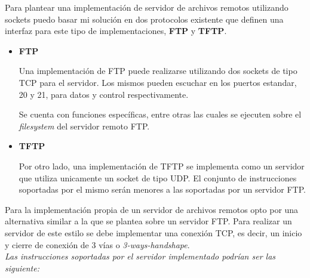 \documentclass[osajnl,twocolumn,showpacs,superscriptaddress,10pt]{revtex4-1} %
\begin{document}
Para plantear una implementación de servidor de archivos remotos utilizando sockets puedo basar mi solución en dos protocolos existente que definen una interfaz para este tipo de implementaciones, \textbf{FTP} y \textbf{TFTP}.

\begin{itemize}
    \item \textbf{FTP}
    
    Una implementación de FTP puede realizarse utilizando dos sockets de tipo TCP para el servidor. Los mismos pueden escuchar en los puertos estandar, 20 y 21, para datos y control respectivamente.
    
    Se cuenta con funciones específicas, entre otras las cuales se ejecuten sobre el \textit{filesystem} del servidor remoto FTP.
    
    \item \textbf{TFTP}
    
    Por otro lado, una implementación de TFTP se implementa como un servidor que utiliza unicamente un socket de tipo UDP. El conjunto de instrucciones soportadas por el mismo serán menores a las soportadas por un servidor FTP.
\end{itemize}

Para la implementación propia de un servidor de archivos remotos opto por una alternativa similar a la que se plantea sobre un servidor FTP. Para realizar un servidor de este estilo se debe implementar una conexión TCP, es decir, un inicio y cierre de conexión de 3 vías o \textit{3-ways-handshape}. \\

\textit{Las instrucciones soportadas por el servidor implementado podrían ser las siguiente:}
\end{document}
